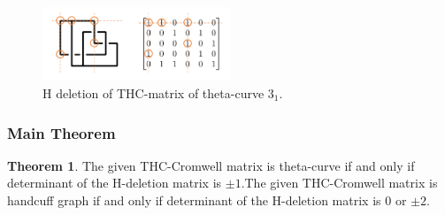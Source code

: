 \documentclass{article}
\theoremstyle{definition}
\theoremstyle{theorem}
\newtheorem{theorem}[thm]{Theorem}
\theoremstyle{proposition}
\theoremstyle{corollary}
\begin{document}
\begin{figure}[h]
    \centerline{\includegraphics[width=0.5\textwidth]{figure/Hdeletion.png}}
    \caption{H deletion of THC-matrix of theta-curve $3_1$.}
    \label{figure_1} 
\end{figure}

\subsubsection{Main Theorem}
\begin{theorem}The given THC-Cromwell matrix is theta-curve if and only if determinant of the H-deletion matrix is $\pm 1$.The given THC-Cromwell matrix is handcuff graph if and only if determinant of the H-deletion matrix is 0 or $\pm 2$.
\end{theorem}
\end{document}
